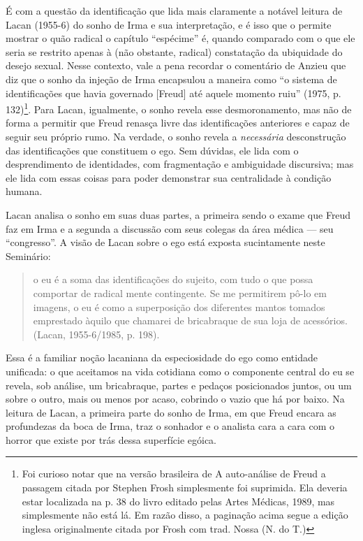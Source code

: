 É com a questão da identificação que lida mais claramente a notável
leitura de Lacan (1955-6) do sonho de Irma e sua interpretação, e é isso
que o permite mostrar o quão radical o capítulo ``espécime'' é, quando
comparado com o que ele seria se restrito apenas à (não obstante,
radical) constatação da ubiquidade do desejo sexual. Nesse contexto,
vale a pena recordar o comentário de Anzieu que diz que o sonho da
injeção de Irma encapsulou a maneira como ``o sistema de identificações
que havia governado {[}Freud{]} até aquele momento ruiu'' (1975, p.
132)\footnote{Foi curioso notar que na versão brasileira de A
  auto-análise de Freud a passagem citada por Stephen Frosh simplesmente
  foi suprimida. Ela deveria estar localizada na p. 38 do livro editado
  pelas Artes Médicas, 1989, mas simplesmente não está lá. Em razão
  disso, a paginação acima segue a edição inglesa originalmente citada
  por Frosh com trad. Nossa (N. do T.)}. Para Lacan, igualmente, o sonho
revela esse desmoronamento, mas não de forma a permitir que Freud
renasça livre das identificações anteriores e capaz de seguir seu
próprio rumo. Na verdade, o sonho revela a \emph{necessária}
desconstrução das identificações que constituem o ego. Sem dúvidas, ele
lida com o desprendimento de identidades, com fragmentação e ambiguidade
discursiva; mas ele lida com essas coisas para poder demonstrar sua
centralidade à condição humana.

Lacan analisa o sonho em suas duas partes, a primeira sendo o exame que
Freud faz em Irma e a segunda a discussão com seus colegas da área
médica --- seu ``congresso''. A visão de Lacan sobre o ego está exposta
sucintamente neste Seminário:

\begin{quote}
o eu é a soma das identificações do sujeito, com tudo o que possa
comportar de radical mente contingente. Se me permitirem pô-lo em
imagens, o eu é como a superposição dos diferentes mantos tomados
emprestado àquilo que chamarei de bricabraque de sua loja de acessórios.
(Lacan, 1955-6/1985, p. 198).
\end{quote}

Essa é a familiar noção lacaniana da especiosidade do ego como entidade
unificada: o que aceitamos na vida cotidiana como o componente central
do eu se revela, sob análise, um bricabraque, partes e pedaços
posicionados juntos, ou um sobre o outro, mais ou menos por acaso,
cobrindo o vazio que há por baixo. Na leitura de Lacan, a primeira parte
do sonho de Irma, em que Freud encara as profundezas da boca de Irma,
traz o sonhador e o analista cara a cara com o horror que existe por
trás dessa superfície egóica.

